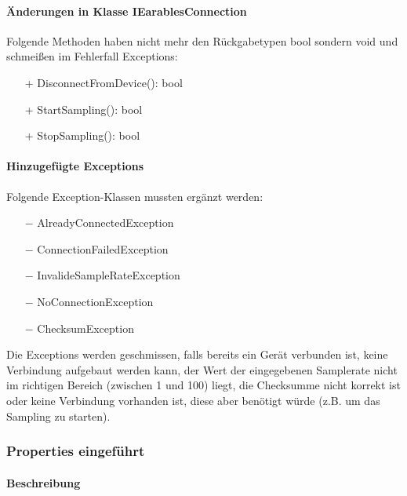 \documentclass[a4paper,12pt]{article}
\begin{document}
\paragraph{Änderungen in Klasse IEarablesConnection}
Folgende Methoden haben nicht mehr den Rückgabetypen bool sondern void und schmeißen im Fehlerfall Exceptions:
\begin{itemize}
	\item[+] DisconnectFromDevice(): bool
	\item[+] StartSampling(): bool
	\item[+] StopSampling(): bool
\end{itemize} 
\paragraph{Hinzugefügte Exceptions}
Folgende Exception-Klassen mussten ergänzt werden:
\begin{itemize}
	\item[$-$] AlreadyConnectedException
	\item[$-$] ConnectionFailedException
	\item[$-$] InvalideSampleRateException
	\item[$-$] NoConnectionException
	\item[$-$] ChecksumException %
\end{itemize}
Die Exceptions werden geschmissen, falls bereits ein Gerät verbunden ist, keine Verbindung aufgebaut werden kann, der Wert der eingegebenen Samplerate nicht im richtigen Bereich (zwischen 1 und 100) liegt, die Checksumme nicht korrekt ist oder keine Verbindung vorhanden ist, diese aber benötigt würde (z.B. um das Sampling zu starten).

\subsubsection{Properties eingeführt}
\paragraph{Beschreibung}
\end{document}

